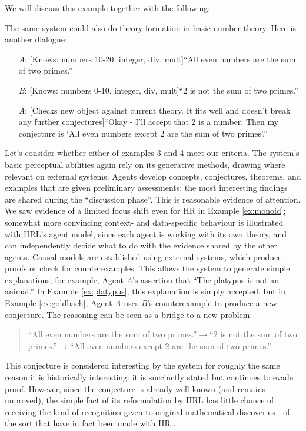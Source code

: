 We will discuss this example together with the following:

\begin{ex}\label{ex:goldbach}
The same system could also do theory formation in basic number theory.
Here is another dialogue:
\begin{itemize}
\item[\emph{A}:] {[}Knows: numbers 10-20, integer, div, mult{]}\newline ``All even numbers are the sum of two primes.''
\item[\emph{B}:] {[}Knows: numbers 0-10, integer, div, mult{]}\newline ``2 is not the sum of two primes.''
\item[\emph{A}:] {[}Checks new object against current theory. It fits well and doesn't break any further conjectures{]}\newline ``Okay - I'll accept that 2 is a number. Then my conjecture is `All even numbers except 2 are the sum of two primes'.''
\end{itemize}
\end{ex}

Let's consider whether either of examples 3 and 4 meet our criteria.
The system's basic perceptual abilities again rely on its generative
methods, drawing where relevant on external systems.  Agents develop
concepts, conjectures, theorems, and examples that are given
preliminary assessments: the most interesting findings are shared
during the ``discussion phase''.  This is reasonable evidence of
attention.  We saw evidence of a limited focus shift even for {\sf HR}
in Example \ref{ex:monoid}; somewhat more convincing context- and
data-specific behaviour is illustrated with {\sf HRL}'s agent model,
since each agent is working with its own theory, and can independently
decide what to do with the evidence shared by the other agents.
Causal models are established using external systems, which produce
proofs or check for counterexamples.  This allows the system to
generate simple explanations, for example, Agent \emph{A}'s assertion
that ``The platypus is not an animal.''
In Example \ref{ex:platypus}, this explanation is simply accepted, but
in Example \ref{ex:goldbach}, Agent \emph{A} uses \emph{B}'s
counterexample to produce a new conjecture.  The reasoning can be seen
as a bridge to a new problem:
\begin{quote}
``All even numbers are the sum of
two primes.''\:$\rightarrow$\:``2 is not the sum of two
primes.''\:$\rightarrow$\:``All even numbers except 2 are the sum of two
primes.'' 
\end{quote}
This conjecture is considered interesting by the system for roughly
the same reason it is historically interesting: it is succinctly
stated but continues to evade proof.  However, since the conjecture
is already well known (and remains unproved), the simple
fact of its reformulation by {\sf HRL} has little chance of 
receiving the kind of recognition given to original mathematical
discoveries---of the sort that have in fact been made with {\sf HR}
\cite{colton2007computational}.

